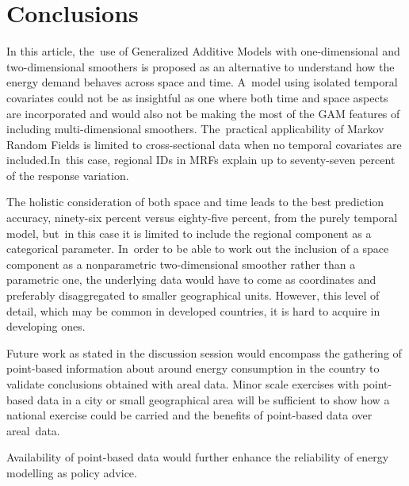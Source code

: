 \documentclass[energies,article,accept,pdftex,moreauthors]{Definitions/mdpi}
\begin{document}
\section{Conclusions}


In this article, the~use of Generalized Additive Models with one-dimensional and two-dimensional smoothers is proposed as an alternative to understand how the energy demand behaves across space and time. A~model using isolated temporal covariates could not be as insightful as one where both time and space aspects are incorporated and would also not be making the most of the GAM features of including multi-dimensional smoothers. The~practical applicability of Markov Random Fields is limited to cross-sectional data when no temporal covariates are included.In~this case, regional IDs in MRFs explain up to seventy-seven percent of the response variation.

The holistic consideration of both space and time leads to the best prediction accuracy, ninety-six percent versus eighty-five percent, from the purely temporal model, but~in this case it is limited to include the regional component as a categorical parameter. In~order to be able to work out the inclusion of a space component as a nonparametric two-dimensional smoother rather than a parametric one, the underlying data would have to come as coordinates and preferably disaggregated to smaller geographical units. However, this level of detail, which may be common in developed countries, it is hard to acquire in developing ones.

Future work as stated in the discussion session would encompass the gathering of point-based information about around energy consumption in the country to validate conclusions obtained with areal data. Minor scale exercises with point-based data in a city or small geographical area will be sufficient to show how a national exercise could be carried and the benefits of point-based data over areal~data.

Availability of point-based data would further enhance the reliability of energy modelling as policy advice.
\end{document}
